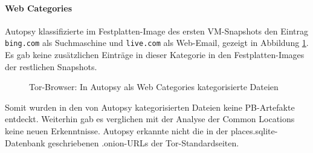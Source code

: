 \begin{appendices}
\paragraph*{Web Categories}
Autopsy klassifizierte im Festplatten-Image des ersten VM-Snapshots den Eintrag \texttt{bing.com} als \glqq{}Suchmaschine\grqq{}  und \texttt{live.com} als \glqq{}Web-Email\grqq{}, gezeigt in Abbildung \ref{img:tor-web-categories}.
Es gab keine zusätzlichen Einträge in dieser Kategorie in den Festplatten-Images der restlichen Snapshots.
\begin{figure}[h!]
	\centerline{} 
	\caption{Tor-Browser: In Autopsy als \glqq{}Web Categories\grqq{} kategorisierte Dateien}
	\label{img:tor-web-categories} 
\end{figure}
		
Somit wurden in den von Autopsy kategorisierten Dateien keine PB-Artefakte entdeckt. Weiterhin gab es verglichen mit der Analyse der Common Locations keine neuen Erkenntnisse. Autopsy erkannte nicht die in der places.sqlite-Datenbank geschriebenen .onion-URLs der Tor-Standardseiten.



\end{appendices}
